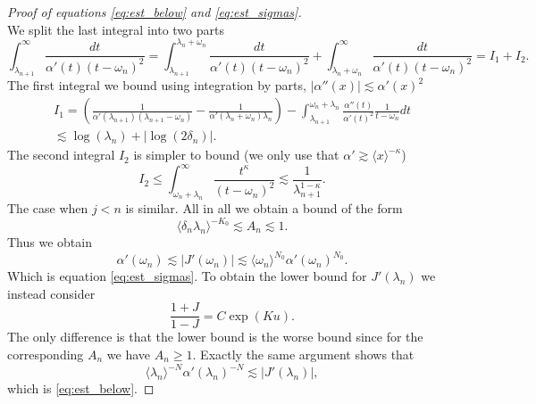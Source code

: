 \documentclass{article}[12pt]
\theoremstyle{remark}
\begin{document}
\begin{proof}[Proof of equations \eqref{eq:est_below} and \eqref{eq:est_sigmas}]
\begin{equation*}
            \end{equation*}
            We split the last integral into two parts
            \begin{equation*}
                \int_{\lambda_{n+1}}^{\infty} \frac{dt}{\alpha'(t)(t-\omega_{n})^{2}} = \int_{\lambda_{n+1}}^{\lambda_{n}+\omega_{n}} \frac{dt}{\alpha'(t)(t-\omega_{n})^{2}} + \int_{\lambda_{n}+\omega_{n}}^{\infty} \frac{dt}{\alpha'(t)(t-\omega_{n})^{2}} = I_{1} + I_{2}.
            \end{equation*}
            The first integral we bound using integration by parts, $\lvert \alpha''(x) \rvert \lesssim \alpha'(x)^{2}$
            \begin{equation*}
                \begin{split}
                    I_{1} = \left(\frac{1}{\alpha'(\lambda_{n+1})(\lambda_{n+1}-\omega_{n})}-\frac{1}{\alpha'(\lambda_{n}+\omega_{n})\lambda_{n}}\right) - \int_{\lambda_{n+1}}^{\omega_{n}+\lambda_{n}} \frac{\alpha''(t)}{\alpha'(t)^{2}}\frac{1}{t-\omega_{n}}dt \\ \lesssim \log(\lambda_{n})+ \lvert\log(2\delta_{n})\rvert.
                \end{split}
            \end{equation*}
            The second integral $I_{2}$ is simpler to bound (we only use that $\alpha' \gtrsim \langle x\rangle^{-\kappa}$)
            \begin{equation*}
                I_{2} \leq \int_{\omega_{n}+\lambda_{n}}^{\infty}\frac{t^{\kappa}}{(t-\omega_{n})^{2}} \lesssim \frac{1}{\lambda_{n+1}^{1-\kappa}}.
            \end{equation*}
            The case when $j < n$ is similar. All in all we obtain a bound of the form
            \begin{equation*}
                \langle \delta_{n} \lambda_{n} \rangle^{-K_{0}}\lesssim A_{n} \lesssim 1.
            \end{equation*}
            Thus we obtain
            \begin{equation*}
                \alpha'(\omega_{n}) \lesssim \lvert J'(\omega_{n}) \rvert \lesssim \langle \omega_{n} \rangle^{N_{0}} \alpha'(\omega_{n})^{N_{0}}.
            \end{equation*}
            Which is equation \eqref{eq:est_sigmas}. To obtain the lower bound for $J'(\lambda_{n})$ we instead consider
            \begin{equation*}
                \frac{1+J}{1-J} = C \exp(Ku).
            \end{equation*}
            The only difference is that the lower bound is the worse bound since for the corresponding $A_{n}$ we have $A_{n} \geq 1$. Exactly the same argument shows that
            \begin{equation*}
                \langle\lambda_{n} \rangle^{-N} \alpha'(\lambda_{n})^{-N} \lesssim \lvert J'(\lambda_{n})\rvert,
            \end{equation*}
            which is \eqref{eq:est_below}.
    \end{proof}
\end{document}
